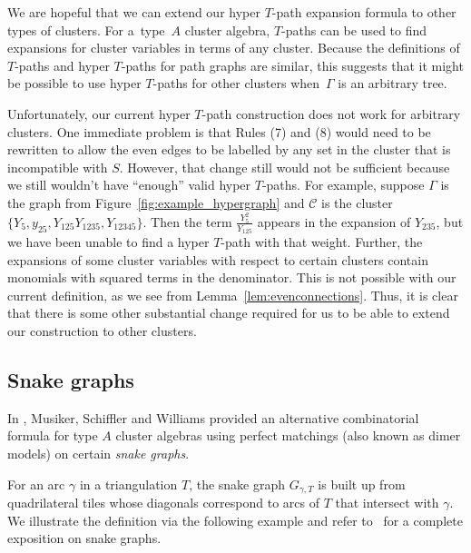 \documentclass[pdftex]{sigma}
\numberwithin{equation}{section}
\begin{document}
We are hopeful that we can extend our hyper $T$-path expansion formula to other types of clusters. For a~type~$A$ cluster algebra, $T$-paths can be used to find expansions for cluster variables in terms of any cluster. Because the definitions of $T$-paths and hyper $T$-paths for path graphs are similar, this suggests that it might be possible to use hyper $T$-paths for other clusters when~$\Gamma$ is an arbitrary tree.

Unfortunately, our current hyper $T$-path construction does not work for arbitrary clusters. One immediate problem is that Rules (7) and (8) would need to be rewritten to allow the even edges to be labelled by any set in the cluster that is incompatible with $S$. However, that change still would not be sufficient because we still wouldn't have ``enough'' valid hyper $T$-paths. For example, suppose $\Gamma$ is the graph from Figure~\ref{fig:example_hypergraph} and $\mathcal{C}$ is the cluster $\{Y_5,y_{25},Y_{125}Y_{1235},Y_{12345}\}$. Then the term $\frac{Y_5^2}{Y_{125}}$ appears in the expansion of $Y_{235}$, but we have been unable to find a hyper $T$-path with that weight. Further, the expansions of some cluster variables with respect to certain clusters contain monomials with squared terms in the denominator. This is not possible with our current definition, as we see from Lemma~\ref{lem:evenconnections}. Thus, it is clear that there is some other substantial change required for us to be able to extend our construction to other clusters.

\subsection{Snake graphs}
In \cite{MSW}, Musiker, Schiffler and Williams provided an alternative combinatorial formula for type $A$ cluster algebras using perfect matchings (also known as dimer models) on certain \emph{snake graphs}.

For an arc $\gamma$ in a triangulation $T$, the snake graph $G_{\gamma, T}$ is built up from quadrilateral tiles whose diagonals correspond to arcs of $T$ that intersect with $\gamma$. We illustrate the definition via the following example and refer to~\cite{MSW} for a complete exposition on snake graphs.
\end{document}
